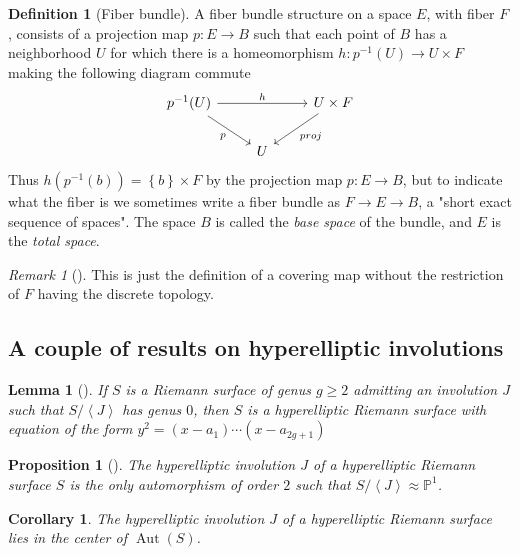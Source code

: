 \documentclass[reqno]{amsart}
\newtheorem{lemma}[theorem]{Lemma}
\newtheorem{proposition}[theorem]{Proposition}
\newtheorem{corollary}[theorem]{Corollary}
\theoremstyle{definition}
\newtheorem{definition}[theorem]{Definition}
\theoremstyle{remark}
\newtheorem*{remark}{Remark}
\DeclareMathOperator{\Aut}{Aut}
\begin{document}
\begin{definition}[Fiber bundle]\label{fiber-bundle-def}
    A fiber bundle structure on a space $E$, with fiber
    $F$, consists of a projection map
    $p \colon E \to B$ such that each point of $B$ has
    a neighborhood $U$ for which there is a homeomorphism
    $h \colon p^{-1}(U) \to U \times F$ making
    the following diagram commute
    \begin{equation*}
    \begin{tikzcd}
        p^{-1}(U) \ar[rr, "h"] \ar[dr, "p"'] & & U \times F
        \ar[dl, "proj"] \\
                                            & U&
    \end{tikzcd}
    \end{equation*}
    Thus
    $h \left( p^{-1}(b) \right) 
    = \left\{ b \right\} \times F$ by the projection map 
    $p \colon E \to B$, but to indicate what the fiber
    is we sometimes write a fiber bundle as
    $F \to E \to B$, a "short exact sequence of spaces".
    The space $B$ is called the \textit{base space} of the
    bundle, and $E$ is the \textit{total space}.
\end{definition}          

\begin{remark}[]
    This is just the definition of a covering map
    without the restriction of $F$ having the discrete
    topology.
\end{remark}
          
\subsection{A couple of results on hyperelliptic involutions}

\begin{lemma}[]
    If $S$ is a Riemann surface of genus $g \ge 2$ admitting
    an involution $J$ such that
    $S / \left<J \right>$ has genus $0$, then
    $S$ is a hyperelliptic Riemann surface with
    equation of the form
    $y^2 = \left( x-a_1 \right) \cdots
    \left( x- a_{2g+1} \right) $
\end{lemma}

\begin{proposition}[]
    The hyperelliptic involution
    $J$ of a hyperelliptic Riemann surface $S$ is
    the only automorphism of order $2$ such that
    $S / \left<J \right> \approx \mathbb{P}^{1}$.
\end{proposition}

\begin{corollary}\label{hyperelliptic-involution-in-center}
    The hyperelliptic involution $J$ of a hyperelliptic
    Riemann surface lies in the center of
    $\Aut (S)$.
\end{corollary}


          




\newpage

\printbibliography
\end{document}
